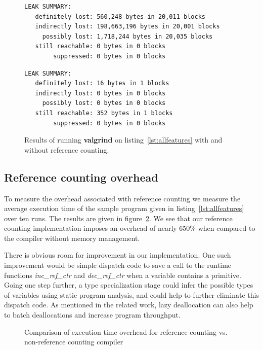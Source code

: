 \documentclass{sigplanconf}
\newcommand{\afunction}[1]{\textit{#1}}
\begin{document}
\begin{figure}[ht]
\footnotesize
\begin{verbatim}
LEAK SUMMARY:
   definitely lost: 560,248 bytes in 20,011 blocks
   indirectly lost: 198,663,196 bytes in 20,001 blocks
     possibly lost: 1,718,244 bytes in 20,035 blocks
   still reachable: 0 bytes in 0 blocks
        suppressed: 0 bytes in 0 blocks
\end{verbatim}
\normalsize

\footnotesize
\begin{verbatim}
LEAK SUMMARY:
   definitely lost: 16 bytes in 1 blocks
   indirectly lost: 0 bytes in 0 blocks
     possibly lost: 0 bytes in 0 blocks
   still reachable: 352 bytes in 1 blocks
        suppressed: 0 bytes in 0 blocks
\end{verbatim}
\normalsize
\caption{Results of running \textbf{valgrind} on listing~\ref{lst:allfeatures} with and without reference counting.}
\label{fig:valgrind}
\end{figure}

\subsection{Reference counting overhead}

To measure the overhead associated with reference counting we measure the average execution time of the sample program given in listing~\ref{lst:allfeatures} over ten runs.  The results are given in figure~\ref{fig:overhead}.  We see that our reference counting implementation imposes an overhead of nearly 650\% when compared to the compiler without memory management.  

There is obvious room for improvement in our implementation.  One such improvement would be simple dispatch code to save a call to the runtime functions \afunction{inc\_ref\_ctr} and \afunction{dec\_ref\_ctr} when a variable contains a primitive.  Going one step further, a type specialization stage could infer the possible types of variables using static program analysis, and could help to further eliminate this dispatch code.  As mentioned in the related work, lazy deallocation can also help to batch deallocations and increase program throughput.

\begin{figure}
\normalsize %

\caption{Comparison of execution time overhead for reference counting vs. non-reference counting compiler}
\label{fig:overhead}
\end{figure}
\end{document}
